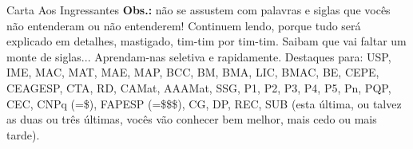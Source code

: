 \begin{editorial}{Carta Aos Ingressantes}
\textbf{Obs.:} não se assustem com palavras e siglas que vocês não entenderam ou 
não entenderem! Continuem lendo, porque tudo será explicado em detalhes, 
mastigado, tim-tim por tim-tim. Saibam que vai faltar um monte de siglas...  
Aprendam-nas seletiva e rapidamente. Destaques para: USP, IME, MAC,
MAT, MAE, MAP, BCC, BM, BMA, LIC, BMAC, BE, CEPE, CEAGESP, CTA, RD, CAMat,
AAAMat, SSG, P1, P2, P3, P4, P5, Pn, PQP, CEC, CNPq (=\$), FAPESP
(=\$\$\$), CG, DP, REC, SUB (esta última, ou talvez as duas ou três últimas,
vocês vão conhecer bem melhor, mais cedo ou mais tarde).

\end{editorial}
